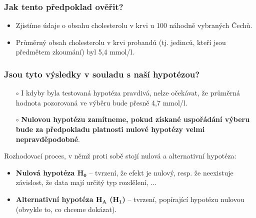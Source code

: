 \subsubsection*{Jak tento předpoklad ověřit?}
\begin{itemize}
	\item Zjistíme údaje o obsahu cholesterolu v krvi u 100 náhodně vybraných Čechů.
	\item Průměrný obsah cholesterolu v krvi probandů (tj. jedinců, kteří jsou předmětem zkoumání) byl 5,4 mmol/l.
\end{itemize}
\subsubsection*{Jsou tyto výsledky v souladu s naší hypotézou?}
\begin{itemize}
	\item[$\circ$] I kdyby byla testovaná hypotéza pravdivá, nelze očekávat, že průměrná hodnota pozorovaná ve výběru bude přesně 4,7 mmol/l.
	\item[$\circ$] \textbf{Nulovou hypotézu zamítneme, pokud získané uspořádání výberu bude za předpokladu platnosti nulové hypotézy velmi nepravděpodobné}.
\end{itemize}
Rozhodovací proces, v němž proti sobě stojí nulová a alternativní hypotéza:
\begin{itemize}
	\item \textbf{Nulová hypotéza $\mathbf{H_0}$} -- tvrzení, že efekt je nulový, resp. že neexistuje závislost, že data mají určitý typ rozdělení, ...
	\item \textbf{Alternativní hypotéza $\mathbf{H_A}$ ($\mathbf{H_1}$)} -- tvrzení, popírající hypotézu nulovou (obvykle to, co chceme dokázat).
\end{itemize}

